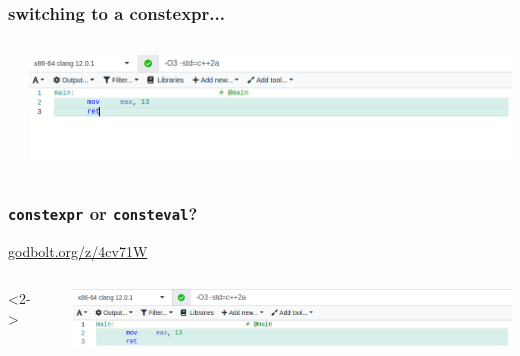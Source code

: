 \documentclass[aspectratio=169]{beamer}
\newcommand{\cpp}[1]{\texttt{\textbf{\textcolor{clCodeBlue}{#1}}}}
\begin{document}
\begin{frame}
\frametitle{switching to a constexpr...}
  \begin{columns}
    \begin{column}{0.45\textwidth}
      {\fontsize{8}{8} }
    \end{column}
    \begin{column}{0.55\textwidth}
      \includegraphics[width=\textwidth]{pics/02_constexpr_assembly}
    \end{column}
  \end{columns}
\end{frame}

\begin{frame}
\frametitle{\cpp{constexpr} or \cpp{consteval}?}
\href{https://godbolt.org/z/4cv71W}{godbolt.org/z/4cv71W}\\
\vspace{12pt}
  \begin{columns}<2->
    \begin{column}{0.45\textwidth}
      {\fontsize{8}{8} }
    \end{column}
    \begin{column}{0.55\textwidth}
      \includegraphics[width=\textwidth]{pics/03_consteval_assembly}
    \end{column}
  \end{columns}
\end{frame}
\end{document}
